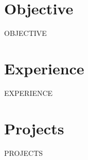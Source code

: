 \documentclass[a4paper,9.5pt]{article}
\begin{document}
\hspace{0.02\textwidth}%
\begin{minipage}[t]{0.665\textwidth}%

\section{Objective}
{\fontsize{8.4}{10.6}\selectfont
{{OBJECTIVE}}
}

\section{Experience}

{{EXPERIENCE}}

\section{Projects}

{{PROJECTS}}

\end{minipage}%
\end{document}
